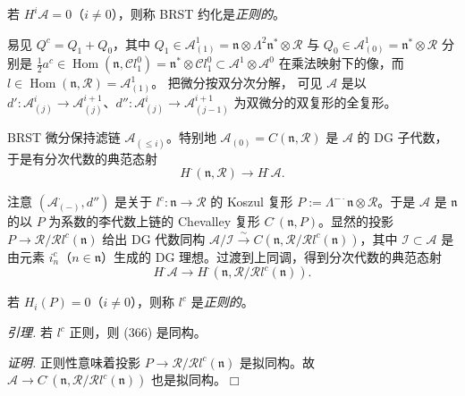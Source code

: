 若 $H^{i}\mathcal{A}=0$（$i\ne0$），则称 BRST 约化是\emph{正则的}。

易见 $Q^{c}=Q_1+Q_0$，其中 $Q_1\in\mathcal{A}^{1}_{(1)}=\mathfrak{n}\otimes\Lambda^{2}\mathfrak{n}^{*}\otimes\mathcal{R}$ 与 $Q_0\in\mathcal{A}^{1}_{(0)}=\mathfrak{n}^{*}\otimes\mathcal{R}$ 分别是 $\frac{1}{2}a^{c}\in\operatorname{Hom}(\mathfrak{n},\mathcal{C}l^{0}_1)=\mathfrak{n}^{*}\otimes\mathcal{C}l^{0}_1\subset\mathcal{A}^{1}\otimes\mathcal{A}^{0}$ 在乘法映射下的像，而 $l\in\operatorname{Hom}(\mathfrak{n},\mathcal{R})=\mathcal{A}^{1}_{(1)}$。
把微分按双分次分解，%
可见 $\mathcal{A}$ 是以 $d':\mathcal{A}^{i}_{(j)}\to\mathcal{A}^{i+1}_{(j)}$、$d'':\mathcal{A}^{i}_{(j)}\to\mathcal{A}^{i+1}_{(j-1)}$ 为双微分的双复形的全复形。

BRST 微分保持滤链 $\mathcal{A}_{(\le i)}$。特别地 $\mathcal{A}_{(0)}=C(\mathfrak{n},\mathcal{R})$ 是 $\mathcal{A}$ 的 DG 子代数，于是有分次代数的典范态射
\begin{equation}\tag{365}
H^{\cdot}(\mathfrak{n},\mathcal{R})\to H^{\cdot}\mathcal{A}.
\end{equation}

注意 $(\mathcal{A}^{\cdot}_{(-)},d'')$ 是关于 $l^{c}:\mathfrak{n}\to\mathcal{R}$ 的 Koszul 复形 $P:=\Lambda^{-\cdot}\mathfrak{n}\otimes\mathcal{R}$。于是 $\mathcal{A}$ 是 $\mathfrak{n}$ 的以 $P$ 为系数的李代数上链的 Chevalley 复形 $C^{\cdot}(\mathfrak{n},P)$。显然的投影 $P\to\mathcal{R}/\mathcal{R}l^{c}(\mathfrak{n})$ 给出 DG 代数同构 $\mathcal{A}/\mathcal{I}\xrightarrow{\sim}C(\mathfrak{n},\mathcal{R}/\mathcal{R}l^{c}(\mathfrak{n}))$，其中 $\mathcal{I}\subset\mathcal{A}$ 是由元素 $i^{c}_n$（$n\in\mathfrak{n}$）生成的 DG 理想。过渡到上同调，得到分次代数的典范态射
\begin{equation}\tag{366}
H^{\cdot}\mathcal{A}\to H^{\cdot}(\mathfrak{n},\mathcal{R}/\mathcal{R}l^{c}(\mathfrak{n})).
\end{equation}

若 $H_i(P)=0$（$i\ne0$），则称 $l^{c}$ 是\emph{正则的}。

 \emph{引理.} 若 $l^{c}$ 正则，则 (366) 是同构。

\emph{证明.} 正则性意味着投影 $P\to\mathcal{R}/\mathcal{R}l^{c}(\mathfrak{n})$ 是拟同构。故 $\mathcal{A}\to C^{\cdot}(\mathfrak{n},\mathcal{R}/\mathcal{R}l^{c}(\mathfrak{n}))$ 也是拟同构。\hfill$\Box$

